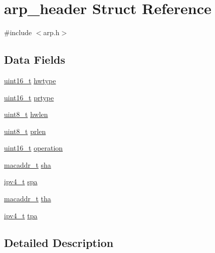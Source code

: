 \hypertarget{structarp__header}{\section{arp\+\_\+header Struct Reference}
\label{structarp__header}
}


{\ttfamily \#include $<$arp.\+h$>$}

\subsection*{Data Fields}
\begin{DoxyCompactItemize}
\item 
\hyperlink{aplus_8h_a5a8b2dc9e45a9ee81a94ef304fb62505}{uint16\+\_\+t} \hyperlink{structarp__header_a571cbbe11fab087a17240660f28c19b9}{hwtype}
\item 
\hyperlink{aplus_8h_a5a8b2dc9e45a9ee81a94ef304fb62505}{uint16\+\_\+t} \hyperlink{structarp__header_aa1b4067ef393ffcada7937d04546570e}{prtype}
\item 
\hyperlink{aplus_8h_ae0430369c5a35dcdbc0bc19dcbb33a03}{uint8\+\_\+t} \hyperlink{structarp__header_ad11b0f96095d8f44e6b21aaa3938df1f}{hwlen}
\item 
\hyperlink{aplus_8h_ae0430369c5a35dcdbc0bc19dcbb33a03}{uint8\+\_\+t} \hyperlink{structarp__header_a9188068c8427afd6f989e98e37a6c9ce}{prlen}
\item 
\hyperlink{aplus_8h_a5a8b2dc9e45a9ee81a94ef304fb62505}{uint16\+\_\+t} \hyperlink{structarp__header_a115cbc3f70bdcb71f36ed74a02ce585f}{operation}
\item 
\hyperlink{netif_8h_a95d524a06a1ff12a314f88bac04db658}{macaddr\+\_\+t} \hyperlink{structarp__header_a1e1ad1e3d78b390d8f31b83cc2d48adc}{sha}
\item 
\hyperlink{netif_8h_aea29db0d4ae23303ff7591af75c7b74a}{ipv4\+\_\+t} \hyperlink{structarp__header_a339356e9ca215db53a3491288ffac730}{spa}
\item 
\hyperlink{netif_8h_a95d524a06a1ff12a314f88bac04db658}{macaddr\+\_\+t} \hyperlink{structarp__header_a013af95c55ed102d198feeab64ce45ee}{tha}
\item 
\hyperlink{netif_8h_aea29db0d4ae23303ff7591af75c7b74a}{ipv4\+\_\+t} \hyperlink{structarp__header_aedc5d2cdff377ab3192ed264d060e914}{tpa}
\end{DoxyCompactItemize}


\subsection{Detailed Description}



